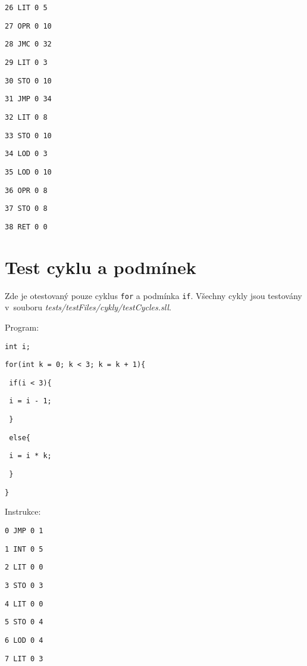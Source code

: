 \documentclass[czech]{thesiskiv}
\begin{document}
\texttt{26	LIT	0	5 }

\texttt{27	OPR	0	10 }

\texttt{28	JMC	0	32  }

\texttt{29	LIT	0	3    }

\texttt{30	STO	0	10    }

\texttt{31	JMP	0	34     }

\texttt{32	LIT	0	8       }

\texttt{33	STO	0	10       }

\texttt{34	LOD	0	3         }

\texttt{35	LOD	0	10         }

\texttt{36	OPR	0	8           }

\texttt{37	STO	0	8            }

\texttt{38	RET	0	0             }



\section{Test cyklu a podmínek}

Zde je otestovaný pouze cyklus \texttt{for} a podmínka \texttt{if}.
Všechny cykly jsou testovány v~souboru \textit{tests/testFiles/cykly/testCycles.sll}.

\noindent Program:

\texttt{int i;}

\texttt{for(int k = 0; k < 3; k = k + 1)\{}
    
\texttt{    if(i < 3)\{ }

\texttt{        i = i - 1;}

\texttt{    \}             }

\texttt{    else\{          }

\texttt{        i = i * k;  }

\texttt{    \}            }

\texttt{\}                 }

\noindent Instrukce:

\texttt{0	JMP	0	1}

\texttt{1	INT	0	5}

\texttt{2	LIT	0	0 }

\texttt{3	STO	0	3  }

\texttt{4	LIT	0	0   }

\texttt{5	STO	0	4    }

\texttt{6	LOD	0	4     }

\texttt{7	LIT	0	3      }
\end{document}
